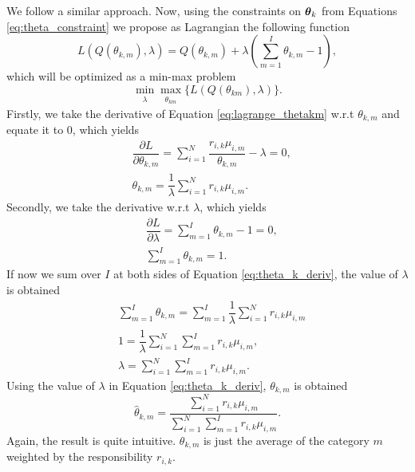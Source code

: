 \documentclass[12pt]{article}
\begin{document}
\noindent We follow a similar approach. Now, using the constraints on $\boldsymbol\theta_k$ from Equations \ref{eq:theta_constraint} we propose as Lagrangian the following function
\begin{equation}\label{eq:lagrange_thetakm}
L\left( Q(\theta_{k,m}),\lambda \right) = Q(\theta_{k,m}) + \lambda \left( \sum \limits_{m=1}^{I} \theta_{k,m} - 1 \right),
\end{equation}
which will be optimized as a min-max problem
\begin{equation}\label{minmax_lagrange_thetakm}
\min_{\substack{\lambda}} \max_{\substack{\theta_{km}}} \lbrace L\left( Q(\theta_{km}),\lambda \right) \rbrace.
\end{equation}
Firstly, we take the derivative of Equation \ref{eq:lagrange_thetakm} w.r.t $\theta_{k,m}$ and equate it to 0, which yields
\begin{align}\label{deriv_thetakm}
& \dfrac{\partial L}{\partial \theta_{k,m}} = \sum \limits_{i=1}^{N} \dfrac{r_{i,k}\mu_{i,m}}{\theta_{k,m}} - \lambda = 0 , \\
& \theta_{k,m} = \dfrac{1}{\lambda} \sum \limits_{i=1}^{N} r_{i,k}\mu_{i,m} \label{eq:theta_k_deriv}.
\end{align}
Secondly, we take the derivative w.r.t $\lambda$, which yields
\begin{align}
& \dfrac{\partial L}{\partial \lambda} = \sum \limits_{m=1}^{I} \theta_{k,m} - 1 = 0,\\
& \sum \limits_{m=1}^{I} \theta_{k,m} = 1.
\end{align}
If now we sum over $I$ at both sides of Equation \ref{eq:theta_k_deriv}, the value of $\lambda$ is obtained
\begin{align}
& \sum \limits_{m=1}^{I}\theta_{k,m} = \sum \limits_{m=1}^{I} \dfrac{1}{\lambda} \sum \limits_{i=1}^{N} r_{i,k}\mu_{i,m}\\
& 1 = \dfrac{1}{\lambda} \sum \limits_{i=1}^{N}\sum \limits_{m=1}^{I}r_{i,k}\mu_{i,m},\\
& \lambda = \sum \limits_{i=1}^{N}\sum \limits_{m=1}^{I}r_{i,k}\mu_{i,m}.
\end{align}
Using the value of $\lambda$ in Equation \ref{eq:theta_k_deriv}, $\theta_{k,m}$ is obtained
\begin{equation}\label{eq:theta_km}
\hat{\theta}_{k,m} = \dfrac{\sum \limits_{i=1}^{N} r_{i,k}\mu_{i,m}}{\sum \limits_{i=1}^{N}\sum \limits_{m=1}^{I}r_{i,k}\mu_{i,m}}.
\end{equation}
Again, the result is quite intuitive. $\theta_{k,m}$ is just the average of the category $m$ weighted by the responsibility $r_{i,k}$.
\end{document}
